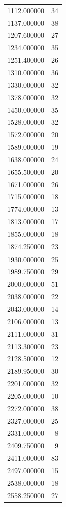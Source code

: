 \begin{tabular}{lr}
1112.000000   &    34 \\
1137.000000   &    38 \\
1207.600000   &    27 \\
1234.000000   &    35 \\
1251.400000   &    26 \\
1310.000000   &    36 \\
1330.000000   &    32 \\
1378.000000   &    32 \\
1450.000000   &    35 \\
1528.000000   &    32 \\
1572.000000   &    20 \\
1589.000000   &    19 \\
1638.000000   &    24 \\
1655.500000   &    20 \\
1671.000000   &    26 \\
1715.000000   &    18 \\
1774.000000   &    13 \\
1813.000000   &    17 \\
1855.000000   &    18 \\
1874.250000   &    23 \\
1930.000000   &    25 \\
1989.750000   &    29 \\
2000.000000   &    51 \\
2038.000000   &    22 \\
2043.000000   &    14 \\
2106.000000   &    13 \\
2111.000000   &    31 \\
2113.300000   &    23 \\
2128.500000   &    12 \\
2189.950000   &    30 \\
2201.000000   &    32 \\
2205.000000   &    10 \\
2272.000000   &    38 \\
2327.000000   &    25 \\
2331.000000   &     8 \\
2409.750000   &     9 \\
2411.000000   &    83 \\
2497.000000   &    15 \\
2538.000000   &    18 \\
2558.250000   &    27 \\

\end{tabular}
